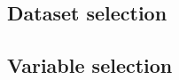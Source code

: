 	\subsection{Dataset selection}

	\subsection{Variable selection}

% 
% 
%    
% 
% 
%  
%    
% 
% 

